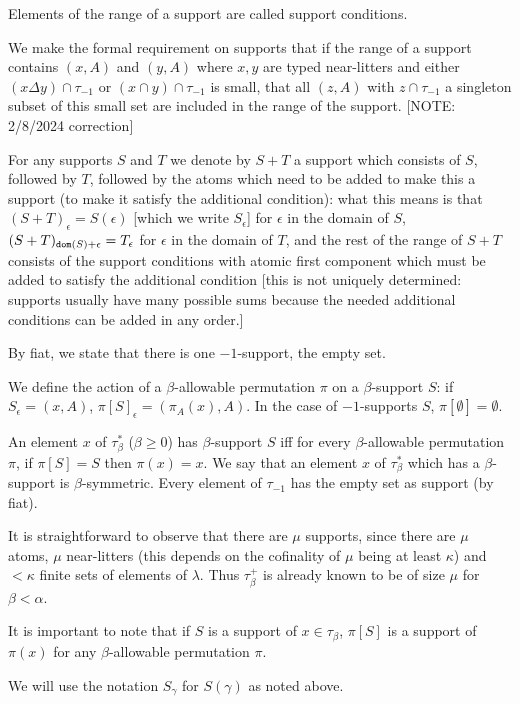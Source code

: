 \documentclass[112pt]{article}
\begin{document}
\begin{description}
Elements of the range of a support are called support conditions.

We make the formal requirement on supports
that if the range of a support contains $(x,A)$ and $(y,A)$ where $x,y$ are typed near-litters and either $(x \Delta y)\cap \tau_{-1}$ or $(x \cap y) \cap \tau_{-1}$ is small, that all $(z,A)$ with $z\cap \tau_{-1}$ a singleton subset of this small set are included in the range of the support. [NOTE:  2/8/2024 correction]

For any supports $S$ and $T$ we denote by $S+T$ a support which consists
of $S$, followed by $T$, followed by the atoms which need to be added to make this a support (to make it satisfy the additional condition):  what this means is that $(S+T)_\epsilon = S(\epsilon)$ [which we write $S_\epsilon$] for $\epsilon$ in the domain of $S$, $(S+T)_{{\tt dom}(S)+\epsilon} = T_\epsilon$ for $\epsilon$ in the domain of $T$, and the rest of the range of $S+T$ consists of the support conditions with atomic first component  which must be added to satisfy the additional condition [this is not uniquely determined:  supports usually have many possible sums because the needed additional conditions can be added in any order.]


By fiat, we state that there is one $-1$-support, the empty set.

We define the action of a $\beta$-allowable permutation $\pi$ on a $\beta$-support $S$:  if $S_\epsilon = (x,A)$, $\pi[S]_\epsilon = (\pi_A(x),A)$.  In the case of $-1$-supports $S$, $\pi[\emptyset]=\emptyset$.

An element $x$ of $\tau^*_\beta$ ($\beta \geq 0$) has $\beta$-support $S$ iff for every $\beta$-allowable permutation $\pi$, if $\pi[S] = S$ then $\pi(x)=x$.  We say that  an element $x$ of $\tau^*_\beta$ which has a $\beta$-support is $\beta$-symmetric. Every element of $\tau_{-1}$ has the empty set as support (by fiat).

It is straightforward to observe that there are $\mu$ supports, since there are $\mu$ atoms, $\mu$ near-litters (this depends on the cofinality of $\mu$ being at least $\kappa$) and
$<\kappa$ finite sets of elements of $\lambda$.  Thus $\tau_\beta^+$ is already known to be of size $\mu$ for $\beta<\alpha$.

It is important to note that if $S$ is a support of $x\in \tau_\beta$, $\pi[S]$ is a support of $\pi(x)$ for any $\beta$-allowable permutation $\pi$.

We will use the notation $S_\gamma$ for $S(\gamma)$ as noted above.


\end{description}
\end{document}
